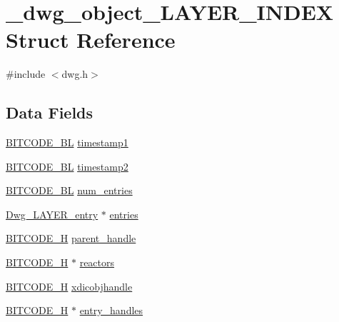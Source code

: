 \hypertarget{struct__dwg__object__LAYER__INDEX}{\section{\-\_\-dwg\-\_\-object\-\_\-\-L\-A\-Y\-E\-R\-\_\-\-I\-N\-D\-E\-X \-Struct \-Reference}
\label{struct__dwg__object__LAYER__INDEX}
}


{\ttfamily \#include $<$dwg.\-h$>$}

\subsection*{\-Data \-Fields}
\begin{DoxyCompactItemize}
\item 
\hyperlink{dwg_8h_aebd5f127038868cbabc3d55d91da776c}{\-B\-I\-T\-C\-O\-D\-E\-\_\-\-B\-L} \hyperlink{struct__dwg__object__LAYER__INDEX_a40e561aa969a33efddddc48035d86d31}{timestamp1}
\item 
\hyperlink{dwg_8h_aebd5f127038868cbabc3d55d91da776c}{\-B\-I\-T\-C\-O\-D\-E\-\_\-\-B\-L} \hyperlink{struct__dwg__object__LAYER__INDEX_a4e6020f69f9f618697e1bddccad609e6}{timestamp2}
\item 
\hyperlink{dwg_8h_aebd5f127038868cbabc3d55d91da776c}{\-B\-I\-T\-C\-O\-D\-E\-\_\-\-B\-L} \hyperlink{struct__dwg__object__LAYER__INDEX_a64b6e4f11ab34be5e02b5a7f47531640}{num\-\_\-entries}
\item 
\hyperlink{dwg_8h_a3dbe36e4218ce148afe02fb7f4eea00d}{\-Dwg\-\_\-\-L\-A\-Y\-E\-R\-\_\-entry} $\ast$ \hyperlink{struct__dwg__object__LAYER__INDEX_a0d43a3de29c61866075d8c430a4deda2}{entries}
\item 
\hyperlink{dwg_8h_a7c700e94e047a97ba8c24bdfe4029dc3}{\-B\-I\-T\-C\-O\-D\-E\-\_\-\-H} \hyperlink{struct__dwg__object__LAYER__INDEX_aa1b6b455f5394a62f4ded2554e36421e}{parent\-\_\-handle}
\item 
\hyperlink{dwg_8h_a7c700e94e047a97ba8c24bdfe4029dc3}{\-B\-I\-T\-C\-O\-D\-E\-\_\-\-H} $\ast$ \hyperlink{struct__dwg__object__LAYER__INDEX_a65aa6f100c82fe90974df918b3ff26e0}{reactors}
\item 
\hyperlink{dwg_8h_a7c700e94e047a97ba8c24bdfe4029dc3}{\-B\-I\-T\-C\-O\-D\-E\-\_\-\-H} \hyperlink{struct__dwg__object__LAYER__INDEX_a1ded31779df4a054cc5d9715ecdf86fe}{xdicobjhandle}
\item 
\hyperlink{dwg_8h_a7c700e94e047a97ba8c24bdfe4029dc3}{\-B\-I\-T\-C\-O\-D\-E\-\_\-\-H} $\ast$ \hyperlink{struct__dwg__object__LAYER__INDEX_a144c92b20f29b2f356724404f084ec75}{entry\-\_\-handles}
\end{DoxyCompactItemize}


